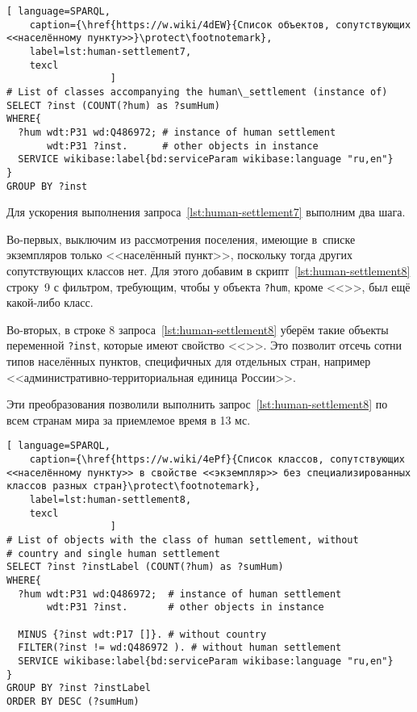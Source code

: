 \begin{lstlisting}[ language=SPARQL, 
    caption={\href{https://w.wiki/4dEW}{Cписок объектов, сопутствующих <<населённому пункту>>}\protect\footnotemark},
    label=lst:human-settlement7,
    texcl 
                  ]
# List of classes accompanying the human\_settlement (instance of)
SELECT ?inst (COUNT(?hum) as ?sumHum) 
WHERE{          
  ?hum wdt:P31 wd:Q486972; # instance of human settlement
       wdt:P31 ?inst.      # other objects in instance
  SERVICE wikibase:label{bd:serviceParam wikibase:language "ru,en"}
}  
GROUP BY ?inst
\end{lstlisting}%

Для ускорения выполнения запроса~\ref{lst:human-settlement7} выполним два шага.
 
Во-первых, выключим из рассмотрения поселения, 
имеющие в~списке экземпляров только <<населённый пункт>>, 
поскольку тогда других сопутствующих классов нет. 
Для этого добавим в скрипт~\ref{lst:human-settlement8} строку~\num{9} с фильтром, 
требующим, чтобы у объекта \lstinline|?hum|, 
кроме  <<>>, был ещё какой-либо класс.

Во-вторых, в строке \num{8} запроса~\ref{lst:human-settlement8} 
уберём такие объекты переменной \lstinline|?inst|, 
которые имеют свойство <<>>. 
Это позволит отсечь сотни типов населённых пунктов, специфичных для отдельных стран, 
например <<административно-территориальная единица России>>.

Эти преобразования позволили выполнить запрос~\ref{lst:human-settlement8} 
по всем странам мира за приемлемое время в 13 мс.


\newpage
\lstset{numbers=left, firstnumber=1, frame=single}
\begin{lstlisting}[ language=SPARQL, 
    caption={\href{https://w.wiki/4ePf}{Cписок классов, сопутствующих <<населённому пункту>> в свойстве <<экземпляр>> без специализированных классов разных стран}\protect\footnotemark},
    label=lst:human-settlement8,
    texcl 
                  ]
# List of objects with the class of human settlement, without 
# country and single human settlement
SELECT ?inst ?instLabel (COUNT(?hum) as ?sumHum) 
WHERE{ 
  ?hum wdt:P31 wd:Q486972;  # instance of human settlement
       wdt:P31 ?inst.       # other objects in instance
  
  MINUS {?inst wdt:P17 []}. # without country
  FILTER(?inst != wd:Q486972 ). # without human settlement
  SERVICE wikibase:label{bd:serviceParam wikibase:language "ru,en"}
}  
GROUP BY ?inst ?instLabel
ORDER BY DESC (?sumHum)
\end{lstlisting}%

